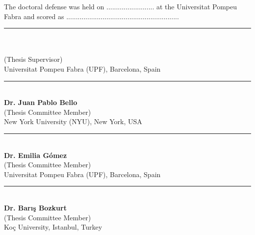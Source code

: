 
\newcommand\advisor[2]{
	\vspace{1.3cm}
	\begin{center}
		\rule{6cm}{0.8pt}\\
		\textbf{#1}\\
		(Thesis Supervisor)\\
		#2
	\end{center}
}
\newcommand\member[2]{
	\vspace{1.3cm}
	\begin{center}
		\rule{6cm}{0.8pt}\\
		\textbf{#1}\\
		(Thesis Committee Member) \\
		#2
	\end{center}
} 

\vspace{1cm}
\noindent The doctoral defense was held on ......................... at the Universitat Pompeu Fabra and scored as ...........................................................\par
\vspace{2cm}
\advisor{\supervisor}{Universitat Pompeu Fabra (UPF), Barcelona, Spain}
\vspace*{0.3cm}

\member{Dr. Juan Pablo Bello}{New York University (NYU), New York, USA}
\member{Dr. Emilia G{\'o}mez}{Universitat Pompeu Fabra (UPF), Barcelona, Spain}
\member{Dr. Barış Bozkurt}{Koç University, Istanbul, Turkey}